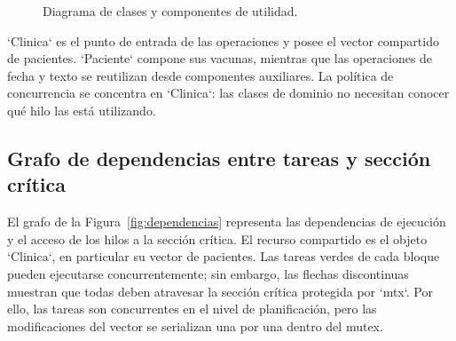 \documentclass[12pt,letterpaper]{article}
\begin{document}
\begin{figure}[H]
\caption{Diagrama de clases y componentes de utilidad.}
\label{fig:clases}
\end{figure}

`Clinica` es el punto de entrada de las operaciones y posee el vector compartido
de pacientes. `Paciente` compone sus vacunas, mientras que las operaciones de
fecha y texto se reutilizan desde componentes auxiliares. La política de
concurrencia se concentra en `Clinica`: las clases de dominio no necesitan
conocer qué hilo las está utilizando.

\subsection{Grafo de dependencias entre tareas y sección crítica}

El grafo de la Figura~\ref{fig:dependencias} representa las dependencias de
ejecución y el acceso de los hilos a la sección crítica. El recurso compartido
es el objeto `Clinica`, en particular su vector de pacientes. Las tareas verdes
de cada bloque pueden ejecutarse concurrentemente; sin embargo, las flechas
discontinuas muestran que todas deben atravesar la sección crítica protegida por
`mtx`. Por ello, las tareas son concurrentes en el nivel de planificación, pero
las modificaciones del vector se serializan una por una dentro del mutex.
\end{document}
